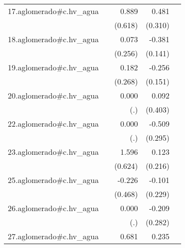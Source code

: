 {\begin{longtable}{l*{4}{D{.}{.}{-1}}}
\addlinespace
17.aglomerado#c.hv\_agua&                     &       0.889         &       0.481         &                     \\
            &                     &     (0.618)         &     (0.310)         &                     \\
\addlinespace
18.aglomerado#c.hv\_agua&                     &       0.073         &      -0.381\sym{**} &                     \\
            &                     &     (0.256)         &     (0.141)         &                     \\
\addlinespace
19.aglomerado#c.hv\_agua&                     &       0.182         &      -0.256         &                     \\
            &                     &     (0.268)         &     (0.151)         &                     \\
\addlinespace
20.aglomerado#c.hv\_agua&                     &       0.000         &       0.092         &                     \\
            &                     &         (.)         &     (0.403)         &                     \\
\addlinespace
22.aglomerado#c.hv\_agua&                     &       0.000         &      -0.509         &                     \\
            &                     &         (.)         &     (0.295)         &                     \\
\addlinespace
23.aglomerado#c.hv\_agua&                     &       1.596\sym{*}  &       0.123         &                     \\
            &                     &     (0.624)         &     (0.216)         &                     \\
\addlinespace
25.aglomerado#c.hv\_agua&                     &      -0.226         &      -0.101         &                     \\
            &                     &     (0.468)         &     (0.229)         &                     \\
\addlinespace
26.aglomerado#c.hv\_agua&                     &       0.000         &      -0.209         &                     \\
            &                     &         (.)         &     (0.282)         &                     \\
\addlinespace
27.aglomerado#c.hv\_agua&                     &       0.681\sym{*}  &       0.235         &                     \\

\end{longtable}}
